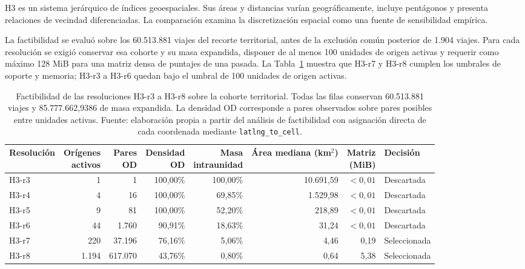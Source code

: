 H3 es un sistema jerárquico de índices geoespaciales. Sus áreas y distancias varían geográficamente, incluye pentágonos y presenta relaciones de vecindad diferenciadas. La comparación examina la discretización espacial como una fuente de sensibilidad empírica.

La factibilidad se evaluó sobre los 60.513.881 viajes del recorte territorial, antes de la exclusión común posterior de 1.904 viajes. Para cada resolución se exigió conservar esa cohorte y su masa expandida, disponer de al menos 100 unidades de origen activas y requerir como máximo 128 MiB para una matriz densa de puntajes de una pasada. La Tabla~\ref{tab:factibilidad_h3} muestra que H3-r7 y H3-r8 cumplen los umbrales de soporte y memoria; H3-r3 a H3-r6 quedan bajo el umbral de 100 unidades de origen activas.

\begin{table}[htbp]
\centering
\fontsize{11}{13.6}\selectfont
\setlength{\tabcolsep}{2.5pt}
\renewcommand{\arraystretch}{1.15}
\caption{Factibilidad de las resoluciones H3-r3 a H3-r8 sobre la cohorte territorial. Todas las filas conservan 60.513.881 viajes y 85.777.662,9386 de masa expandida. La densidad OD corresponde a pares observados sobre pares posibles entre unidades activas. Fuente: elaboración propia a partir del análisis de factibilidad con asignación directa de cada coordenada mediante \texttt{latlng\_to\_cell}.}
\label{tab:factibilidad_h3}
\begin{tabular*}{\textwidth}{@{\extracolsep{\fill}}lrrrrrrl@{}}
\toprule
\textbf{Resolución} & \shortstack{\textbf{Orígenes}\\\textbf{activos}} & \shortstack{\textbf{Pares}\\\textbf{OD}} & \shortstack{\textbf{Densidad}\\\textbf{OD}} & \shortstack{\textbf{Masa}\\\textbf{intraunidad}} & \shortstack{\textbf{Área mediana}\\\textbf{(km$^2$)}} & \shortstack{\textbf{Matriz}\\\textbf{(MiB)}} & \textbf{Decisión} \\
\midrule
H3-r3 & 1 & 1 & 100,00\% & 100,00\% & 10.691,59 & $<0{,}01$ & Descartada \\
H3-r4 & 4 & 16 & 100,00\% & 69,85\% & 1.529,98 & $<0{,}01$ & Descartada \\
H3-r5 & 9 & 81 & 100,00\% & 52,20\% & 218,89 & $<0{,}01$ & Descartada \\
H3-r6 & 44 & 1.760 & 90,91\% & 18,63\% & 31,24 & $<0{,}01$ & Descartada \\
H3-r7 & 220 & 37.196 & 76,16\% & 5,06\% & 4,46 & 0,19 & Seleccionada \\
H3-r8 & 1.194 & 617.070 & 43,76\% & 0,80\% & 0,64 & 5,38 & Seleccionada \\
\bottomrule
\end{tabular*}
\end{table}

